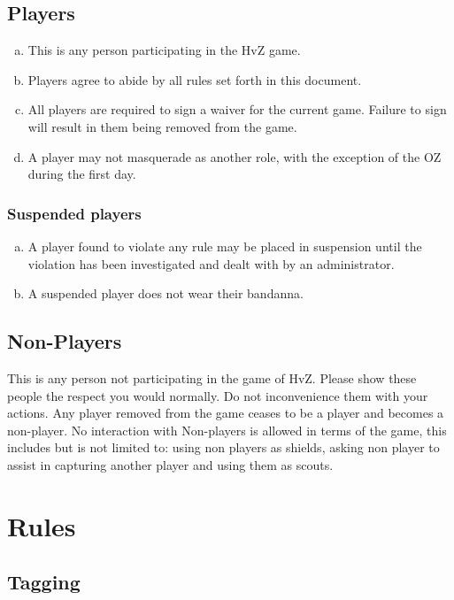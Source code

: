 \documentclass[a4paper,12pt]{article}
\begin{document}
\subsection{Players}

\begin{enumerate}[(a)]
    \item This is any person participating in the HvZ game.
    \item Players agree to abide by all rules set forth in this document.
    \item All players are required to sign a waiver for the current game. Failure to sign will result in them being removed from the game. 
    \item A player may not masquerade as another role, with the exception of the OZ during the first day.
\end{enumerate}

\subsubsection{Suspended players}

\begin{enumerate}[(a)]
    \item A player found to violate any rule may be placed in suspension until the violation has been investigated and dealt with by an administrator.
    \item A suspended player does not wear their bandanna.
\end{enumerate}


\subsection{Non-Players}

This is any person not participating in the game of HvZ.
Please show these people the respect you would normally. Do not inconvenience them with your actions.
Any player removed from the game ceases to be a player and becomes a non-player. No interaction with Non-players is allowed in terms of the game, this includes but is not limited to: using non players as shields, asking non player to assist in capturing another player and using them as scouts.

\section{Rules}

\subsection{Tagging}
\end{document}
